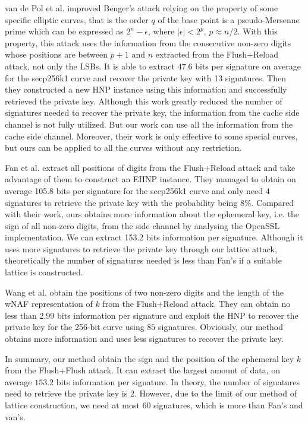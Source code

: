 van de Pol et al. \cite{Van2015} improved Benger's attack  relying on the property of some specific elliptic curves, that is the order $q$ of the base point is a pseudo-Mersenne prime which can be expressed as $2^n - \epsilon$, where $|\epsilon| < 2^p $, $p \approx n/2$.
With this property, this attack uses the information from the consecutive non-zero digits whose positions are between $p+1$ and $n$ extracted from the Flush+Reload attack, not only the LSBs.
It is able to extract $47.6$ bits per signature on average for the secp256k1 curve and recover the private key with 13 signatures.
Then they constructed a new HNP instance using this information and
successfully retrieved the private key.
Although this work greatly reduced the number of signatures needed to recover the private key,
the information from the cache side channel is not fully utilized.
But our work can use all the information from the cache side channel.
Moreover, their work is only effective to some special curves,
 but ours can be applied to all the curves without any restriction.


Fan et al.\cite{Fan2016} extract all positions of digits from the Flush+Reload attack and take advantage of them to construct an EHNP instance.
They managed to obtain on average 105.8 bits per signature for the secp256k1 curve
 and only need 4 signatures to retrieve the private key with the probability being $8\%$.
 Compared with their work, ours obtains more information about the ephemeral key, i.e. the sign of all non-zero digits, from the side channel by analysing the OpenSSL implementation.
We can extract 153.2 bits information per signature.
Although it uses more signatures to retrieve the private key through our lattice attack,
theoretically the number of signatures needed is less than Fan's if a suitable lattice is constructed.

Wang et al. \cite{Wang2017} obtain the positions of two non-zero digits and the length of the wNAF representation of $k$ from the Flush+Reload attack.
They can obtain no less than 2.99 bits information per signature and exploit the HNP to recover the private key for the 256-bit curve using $85$ signatures.
Obviously, our method obtains more information and uses less signatures to recover the private key.

In summary, our method obtain the sign and the position of the ephemeral key $k$ from the Flush+Flush attack.
It can extract the largest amount of data, on average $153.2$ bits information per signature.
In theory, the number of signatures need to retrieve the private key is $2$.
  However, due to the limit of our method of lattice construction, we need at most $60$ signatures, which is more than Fan's and van's.






























